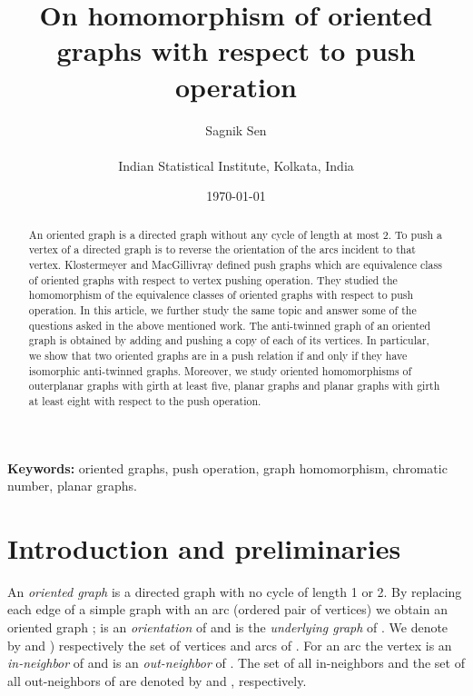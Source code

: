 \documentclass[10pt]{article}
\begin{document}
\title{{\bf On homomorphism of oriented graphs with respect to push operation}}
\author{ {\sc Sagnik Sen}\\
\mbox{}\\
{\small Indian Statistical Institute, Kolkata, India}
}


\date{\today}

\maketitle

\begin{abstract}
An oriented graph is a directed graph without any cycle of length at most 2. 
 To push a vertex of a directed graph is to reverse the orientation of the arcs incident to that vertex.
Klostermeyer and MacGillivray  defined push graphs which are equivalence class of oriented graphs with respect to vertex pushing operation. 
They studied the homomorphism of the equivalence classes of oriented graphs with respect to push operation.  
In this article, we further study the same topic and answer some of the questions asked in the above mentioned work. 
The anti-twinned  graph of an oriented graph is obtained by adding and pushing a copy of each of its vertices. 
In particular, we show that two oriented graphs are in a push relation if and only if they have isomorphic anti-twinned graphs. 
Moreover, we study oriented homomorphisms of outerplanar graphs with girth at least five, planar graphs and planar graphs with girth at least eight with respect to the push operation.  
\end{abstract}

\noindent \textbf{Keywords:} oriented graphs, push operation, graph homomorphism, chromatic number, planar graphs.



\section{Introduction and preliminaries}


An {\textit{oriented graph}} 
 is a directed graph with no cycle of length 1 or 2. By replacing each edge of a simple graph  with an arc (ordered pair of vertices)
  we obtain an oriented graph ;   is  an \textit{orientation} of  and  is the \textit{underlying graph} of .
  We denote by   and )   respectively  the set of vertices  and arcs  of .   
For an arc  the vertex  is an \textit{in-neighbor} of  and  is an \textit{out-neighbor} of . 
 The set of all in-neighbors and the set of all out-neighbors of  are denoted by  
  and , respectively. 
\end{document}

